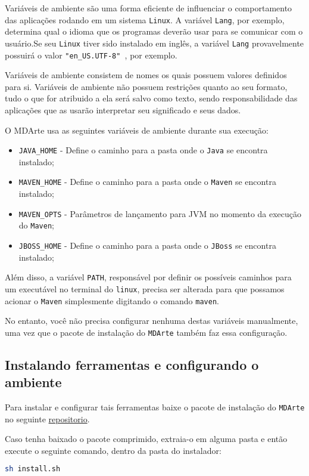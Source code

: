 Variáveis de ambiente são uma forma eficiente de influenciar o comportamento das
aplicações rodando em um sistema \texttt{Linux}. A variável \texttt{Lang}, por
exemplo, determina qual o idioma que os programas deverão usar para se comunicar
com o usuário.Se seu \texttt{Linux} tiver sido instalado em inglês, a variável \texttt{Lang}
provavelmente possuirá o valor \texttt{"en\_US.UTF-8" }, por exemplo.

Variáveis de ambiente consistem de nomes os quais possuem valores definidos para
si. Variáveis de ambiente não possuem restrições quanto ao seu formato, tudo o
que for atribuido a ela será salvo como texto, sendo responsabilidade das
aplicações que as usarão interpretar seu significado e seus dados. 

O MDArte usa as seguintes variáveis de ambiente durante sua execução:
\begin{itemize}
  \item \texttt{JAVA\_HOME} - Define o caminho para a pasta onde o \texttt{Java}
  se encontra instalado;
  \item \texttt{MAVEN\_HOME} - Define o caminho para a pasta onde o
  \texttt{Maven} se encontra instalado;
  \item \texttt{MAVEN\_OPTS} - Parâmetros de lançamento para JVM no momento da
  execução do \texttt{Maven};
  \item \texttt{JBOSS\_HOME} - Define o caminho para a pasta onde o
  \texttt{JBoss} se encontra instalado;
\end{itemize}

Além disso, a variável \texttt{PATH}, responsável por definir os possíveis
caminhos para um executável no terminal do \texttt{linux}, precisa ser alterada
para que possamos acionar o \texttt{Maven} simplesmente digitando o comando
\texttt{maven}.

No entanto, você não precisa configurar nenhuma destas variáveis manualmente,
uma vez que o pacote de instalação do \texttt{MDArte} também faz essa
configuração.

\subsection{Instalando ferramentas e configurando o ambiente}
Para instalar e configurar tais ferramentas baixe o pacote de instalação do
\texttt{MDArte} no seguinte
\href{https://github.com/MDArte/mdarte-installer}{repositorio}.

Caso tenha baixado o pacote comprimido, extraia-o em alguma pasta e então
execute o seguinte comando, dentro da pasta do instalador:
\begin{lstlisting}[language=bash]
	sh install.sh
\end{lstlisting}

